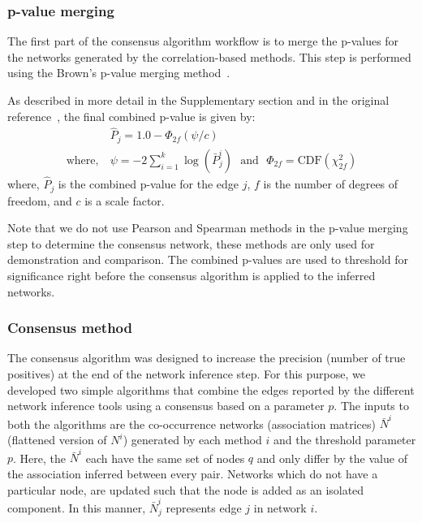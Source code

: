   \subsubsection*{p-value merging}
  \vspace{-5mm}
  The first part of the consensus algorithm workflow is to merge the p-values for the networks generated by the correlation-based methods.
  This step is performed using the Brown's p-value merging method~\cite{Poole_Gibbs_Shmulevich_Bernard_Knijnenburg_2016,faustCoNetAppInference2016}.

  As described in more detail in the Supplementary section and in the original reference~\cite{Poole_Gibbs_Shmulevich_Bernard_Knijnenburg_2016}, the final combined p-value is given by:
  \begin{equation}
    \begin{aligned}
        & \hat{P}_j = 1.0 - \Phi_{2f}\left( \psi / c \right) \\
        \text{where},~ &\psi = -2 \sum_{i=1}^k \log(\bar{P}^i_j) ~~~\text{and}~~~ \Phi_{2f} = \mathrm{CDF}\left( \chi^2_{2f} \right)
    \end{aligned}
    \label{eqn:pvalue-combined}
  \end{equation}
  where, $\hat{P}_j$ is the combined p-value for the edge $j$, $f$ is the number of degrees of freedom, and $c$ is a scale factor.

  Note that we do not use Pearson and Spearman methods in the p-value merging step to determine the consensus network, these methods are only used for demonstration and comparison.
  The combined p-values are used to threshold for significance right before the consensus algorithm is applied to the inferred networks.

  \subsubsection*{Consensus method}
  \vspace{-5mm}
  The consensus algorithm was designed to increase the precision (number of true positives) at the end of the network inference step.
  For this purpose, we developed two simple algorithms that combine the edges reported by the different network inference tools using a consensus based on a parameter $p$.
  The inputs to both the algorithms are the co-occurrence networks (association matrices) $\bar{N}^i$ (flattened version of $N^{i}$) generated by each method $i$ and the threshold parameter $p$.
  Here, the $\bar{N}^{i}$ each have the same set of nodes $q$ and only differ by the value of the association inferred between every pair.
  Networks which do not have a particular node, are updated such that the node is added as an isolated component.
  In this manner, $\bar{N}^{i}_j$ represents edge $j$ in network $i$.

